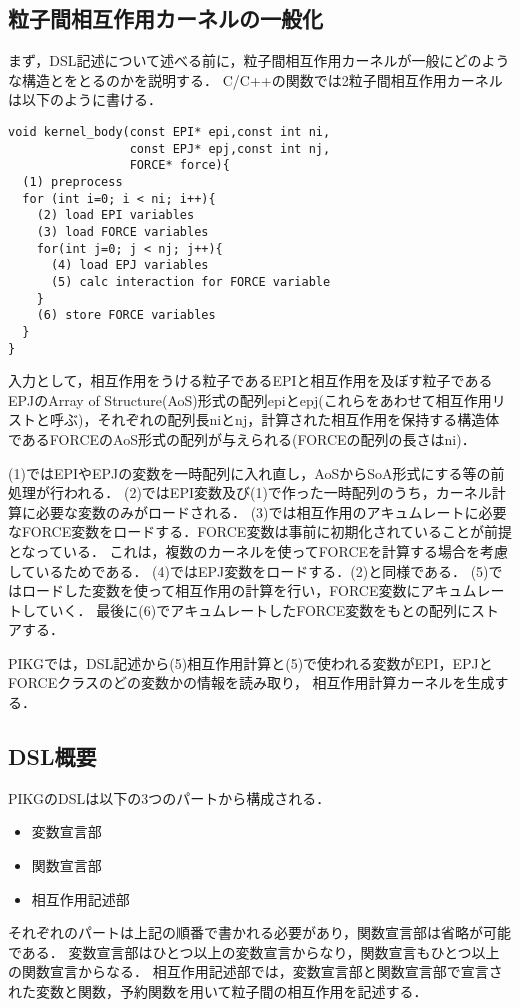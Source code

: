 \documentclass{article}
\begin{document}
\subsection{粒子間相互作用カーネルの一般化}
まず，DSL記述について述べる前に，粒子間相互作用カーネルが一般にどのような構造とをとるのかを説明する．
C/C++の関数では2粒子間相互作用カーネルは以下のように書ける．
\begin{verbatim}
void kernel_body(const EPI* epi,const int ni,
                 const EPJ* epj,const int nj,
                 FORCE* force){
  (1) preprocess
  for (int i=0; i < ni; i++){
    (2) load EPI variables
    (3) load FORCE variables
    for(int j=0; j < nj; j++){
      (4) load EPJ variables
      (5) calc interaction for FORCE variable
    }
    (6) store FORCE variables
  }
}
\end{verbatim}
入力として，相互作用をうける粒子であるEPIと相互作用を及ぼす粒子であるEPJのArray of Structure(AoS)形式の配列epiとepj(これらをあわせて相互作用リストと呼ぶ)，それぞれの配列長niとnj，計算された相互作用を保持する構造体であるFORCEのAoS形式の配列が与えられる(FORCEの配列の長さはni)．

(1)ではEPIやEPJの変数を一時配列に入れ直し，AoSからSoA形式にする等の前処理が行われる．
(2)ではEPI変数及び(1)で作った一時配列のうち，カーネル計算に必要な変数のみがロードされる．
(3)では相互作用のアキュムレートに必要なFORCE変数をロードする．FORCE変数は事前に初期化されていることが前提となっている．
これは，複数のカーネルを使ってFORCEを計算する場合を考慮しているためである．
(4)ではEPJ変数をロードする．(2)と同様である．
(5)ではロードした変数を使って相互作用の計算を行い，FORCE変数にアキュムレートしていく．
最後に(6)でアキュムレートしたFORCE変数をもとの配列にストアする．

PIKGでは，DSL記述から(5)相互作用計算と(5)で使われる変数がEPI，EPJとFORCEクラスのどの変数かの情報を読み取り，
相互作用計算カーネルを生成する．

\subsection{DSL概要}
PIKGのDSLは以下の3つのパートから構成される．
 \begin{itemize}
  \item 変数宣言部
  \item 関数宣言部
  \item 相互作用記述部
 \end{itemize}
 それぞれのパートは上記の順番で書かれる必要があり，関数宣言部は省略が可能である．
 変数宣言部はひとつ以上の変数宣言からなり，関数宣言もひとつ以上の関数宣言からなる．
 相互作用記述部では，変数宣言部と関数宣言部で宣言された変数と関数，予約関数を用いて粒子間の相互作用を記述する．
\end{document}
